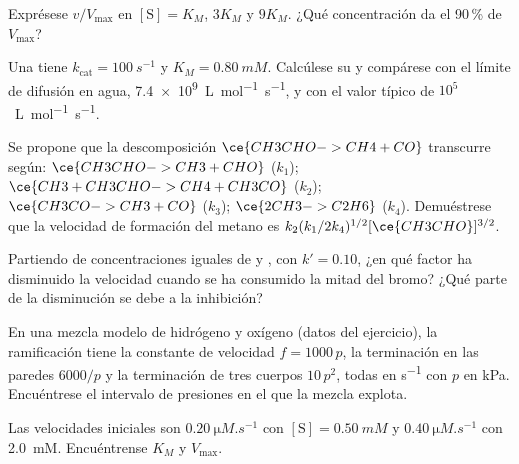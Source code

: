 \begin{exercise}[$\star$]\label{exo:b3:complex-kinetics:3}
Exprésese $v/V_{\max}$ en $[\mathrm S] = K_M$, $3K_M$ y $9K_M$. ¿Qué concentración da el 90\,\% de
$V_{\max}$?
\end{exercise}

\begin{exercise}[$\star$]\label{exo:b3:complex-kinetics:4}
Una  tiene $k_{\mathrm{cat}} = \qty{100}{s^{-1}}$ y $K_M = \qty{0.80}{mM}$. Calcúlese su  y compárese con el límite de difusión en agua, \qty{7.4e9}{L.mol^{-1}.s^{-1}},
y con el valor típico de $10^5$~\unit{L.mol^{-1}.s^{-1}}.
\end{exercise}

\begin{exercise}[$\star\star$]\label{exo:b3:complex-kinetics:5}
Se propone que la descomposición $\ce{CH3CHO -> CH4 + CO}$ transcurre según: $\ce{CH3CHO -> CH3 +
CHO}$ ($k_1$); $\ce{CH3 + CH3CHO -> CH4 + CH3CO}$ ($k_2$); $\ce{CH3CO -> CH3 + CO}$ ($k_3$);
$\ce{2 CH3 -> C2H6}$ ($k_4$). Demuéstrese que la velocidad de formación del metano es
$k_2(k_1/2k_4)^{1/2}[\ce{CH3CHO}]^{3/2}$.
\end{exercise}

\begin{exercise}[$\star\star$]\label{exo:b3:complex-kinetics:6}
Partiendo de concentraciones iguales de  y , con $k' = 0.10$, ¿en qué
factor ha disminuido la velocidad cuando se ha consumido la mitad del bromo? ¿Qué parte de la
disminución se debe a la inhibición?
\end{exercise}

\begin{exercise}[$\star\star$]\label{exo:b3:complex-kinetics:7}
En una mezcla modelo de hidrógeno y oxígeno (datos del ejercicio), la ramificación tiene la
constante de velocidad $f = 1000\,p$, la terminación en las paredes $6000/p$ y la terminación de tres cuerpos
$10\,p^2$, todas en \unit{s^{-1}} con $p$ en kPa. Encuéntrese el intervalo de presiones en el que la mezcla
explota.
\end{exercise}

\begin{exercise}[$\star\star$]\label{exo:b3:complex-kinetics:8}
Las velocidades iniciales son $\qty{0.20}{\micro M.s^{-1}}$ con $[\mathrm S] = \qty{0.50}{mM}$ y $\qty{0.40}{\micro M.s^{-1}}$ con
\qty{2.0}{mM}. Encuéntrense $K_M$ y $V_{\max}$.
\end{exercise}

